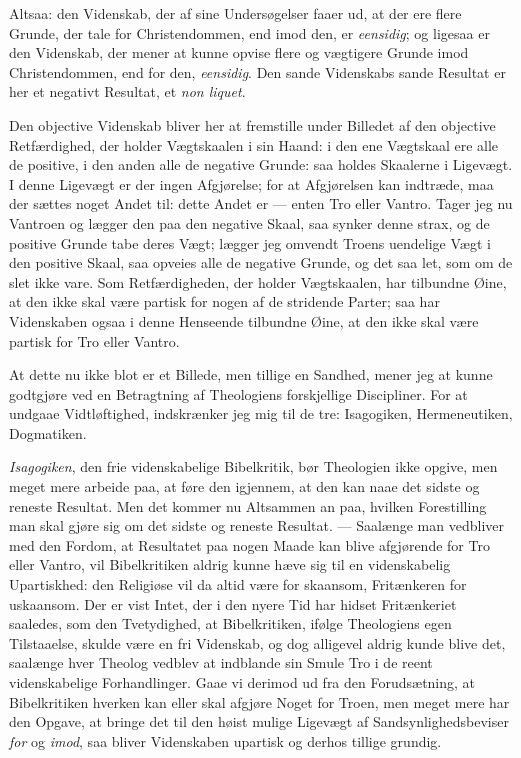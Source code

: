 \documentclass[12pt,a4paper]{book}
\newcommand{\opage}[1]{\marginnote{\footnotesize\textit{[#1]}}}
\begin{document}
Altsaa: den Videnskab, der af sine Undersøgelser faaer ud, at der ere flere
Grunde, der tale for Christendommen, end imod den, er \emph{eensidig}; og
ligesaa er den Videnskab, der mener at kunne opvise flere og vægtigere Grunde
imod Christendommen, end for den, \emph{eensidig}. Den sande Videnskabs sande
Resultat er her et negativt Resultat, et \textit{non liquet}.

Den objective Videnskab bliver her at fremstille under Billedet af den objective
Retfærdighed, der holder Vægtskaalen i sin Haand: i den ene Vægtskaal ere alle
de positive, i den anden alle de negative Grunde: saa holdes Skaalerne i
Ligevægt. I denne Ligevægt er der ingen Afgjørelse; for at Afgjørelsen kan
indtræde, maa der sættes noget Andet til: dette Andet er --- enten Tro eller
Vantro. Tager jeg nu Vantroen og lægger den paa den negative Skaal, saa synker
denne strax, og de positive Grunde tabe deres Vægt; lægger jeg omvendt Troens
uendelige Vægt i den positive Skaal, saa opveies alle de negative Grunde, og det
saa let, som om de slet ikke vare. Som Retfærdigheden, der holder Vægtskaalen,
har tilbundne Øine, at den ikke skal være partisk for nogen af de stridende
Parter; saa har Videnskaben ogsaa i denne Henseende tilbundne Øine, at den ikke
skal være partisk for Tro eller Vantro.

At dette nu ikke blot er et Billede, men tillige en Sandhed, mener jeg at kunne
godtgjøre ved en Betragtning af Theologiens forskjellige Discipliner. For at
undgaae Vidtløftighed, indskrænker jeg mig til de tre: Isagogiken,
Hermeneutiken, Dogmatiken.

\emph{Isagogiken}, den frie videnskabelige Bibelkritik, bør Theologien ikke
opgive, men meget mere arbeide paa, at føre den
\opage{147} igjennem, at den kan naae det sidste og reneste Resultat. Men det kommer nu
Altsammen an paa, hvilken Forestilling man skal gjøre sig om det sidste og
reneste Resultat. --- Saalænge man vedbliver med den Fordom, at Resultatet paa
nogen Maade kan blive afgjørende for Tro eller Vantro, vil Bibelkritiken aldrig
kunne hæve sig til en videnskabelig Upartiskhed: den Religiøse vil da altid være
for skaansom, Fritænkeren for uskaansom. Der er vist Intet, der i den nyere Tid
har hidset Fritænkeriet saaledes, som den Tvetydighed, at Bibelkritiken, ifølge
Theologiens egen Tilstaaelse, skulde være en fri Videnskab, og dog alligevel
aldrig kunde blive det, saalænge hver Theolog vedblev at indblande sin Smule Tro
i de reent videnskabelige Forhandlinger. Gaae vi derimod ud fra den
Forudsætning, at Bibelkritiken hverken kan eller skal afgjøre Noget for Troen,
men meget mere har den Opgave, at bringe det til den høist mulige Ligevægt af
Sandsynlighedsbeviser \emph{for} og \emph{imod}, saa bliver Videnskaben upartisk og
derhos tillige grundig.
\end{document}

